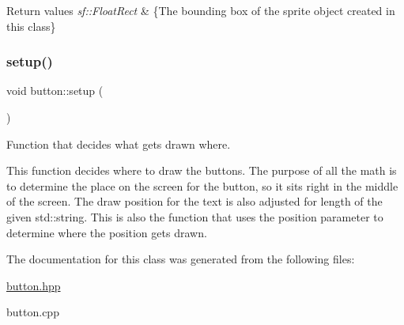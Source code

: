 \begin{DoxyRetVals}{Return values}
{\em sf\+::\+Float\+Rect} & \{The bounding box of the sprite object created in this class\} \\
\hline
\end{DoxyRetVals}
\mbox{\label{classbutton_aaa445c71f07d867926dfcd57016064e6}} 
\subsubsection{\texorpdfstring{setup()}{setup()}}
{\footnotesize\ttfamily void button\+::setup (\begin{DoxyParamCaption}{ }\end{DoxyParamCaption})}



Function that decides what gets drawn where. 

This function decides where to draw the buttons. The purpose of all the math is to determine the place on the screen for the button, so it sits right in the middle of the screen. The draw position for the text is also adjusted for length of the given std\+::string. This is also the function that uses the position parameter to determine where the position gets drawn. 

The documentation for this class was generated from the following files\+:\begin{DoxyCompactItemize}
\item 
\hyperlink{button_8hpp}{button.\+hpp}\item 
button.\+cpp\end{DoxyCompactItemize}
